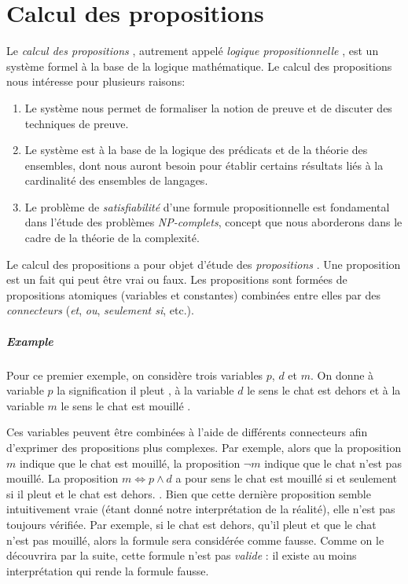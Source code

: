 \chapter{Calcul des propositions}

Le \og \textit{calcul des propositions} \fg{}, autrement appelé \og \textit{logique propositionnelle} \fg{}, est un système formel à la base de la logique mathématique. Le calcul des propositions nous intéresse pour plusieurs raisons:
\begin{enumerate}
\item
Le système nous permet de formaliser la notion de preuve et de discuter des techniques de preuve.
\item
Le système est à la base de la logique des prédicats et de la théorie des ensembles, dont nous auront besoin pour établir certains résultats liés à la cardinalité des ensembles de langages.
\item
Le problème de \og \textit{satisfiabilité} \fg{} d'une formule propositionnelle est fondamental dans l'étude des problèmes \textit{NP-complets}, concept que nous aborderons dans le cadre de la théorie de la complexité.
\end{enumerate}

Le calcul des propositions a pour objet d'étude des \og \textit{propositions} \fg{}.
Une proposition est un fait qui peut être vrai ou faux.
Les propositions sont formées de propositions atomiques (variables et constantes) combinées entre elles par des \og \textit{connecteurs} \fg{} (\textit{et}, \textit{ou}, \textit{seulement si}, etc.).

\paragraph{Example}

Pour ce premier exemple, on considère trois variables $p$, $d$ et $m$.
On donne à variable $p$ la signification \og il pleut \fg{}, à la variable $d$ le sens \og le chat est dehors \fg{} et à la variable $m$ le sens \og le chat est mouillé \fg{}.

Ces variables peuvent être combinées à l'aide de différents connecteurs afin d'exprimer des propositions plus complexes.
Par exemple, alors que la proposition $m$ indique que le chat est mouillé, la proposition $\neg m$ indique que le chat n'est pas mouillé.
La proposition $m \iff p \wedge d$ a pour sens \og le chat est mouillé si et seulement si il pleut et le chat est dehors. \fg{}.
Bien que cette dernière proposition semble intuitivement vraie (étant donné notre interprétation de la réalité), elle n'est pas toujours vérifiée.
Par exemple, si le chat est dehors, qu'il pleut et que le chat n'est pas mouillé, alors la formule sera considérée comme fausse.
Comme on le découvrira par la suite, cette formule n'est pas \og \textit{valide} \fg{}: il existe au moins interprétation qui rende la formule fausse.

